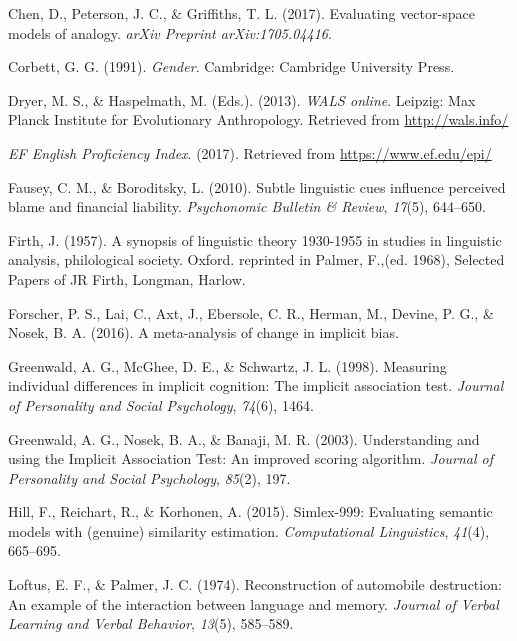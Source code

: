 \documentclass[10pt, letterpaper]{article}
\begin{document}
\hypertarget{ref-chen2017evaluating}{}
Chen, D., Peterson, J. C., \& Griffiths, T. L. (2017). Evaluating
vector-space models of analogy. \emph{arXiv Preprint arXiv:1705.04416}.

\hypertarget{ref-corbett1991}{}
Corbett, G. G. (1991). \emph{Gender}. Cambridge: Cambridge University
Press.

\hypertarget{ref-wals}{}
Dryer, M. S., \& Haspelmath, M. (Eds.). (2013). \emph{WALS online}.
Leipzig: Max Planck Institute for Evolutionary Anthropology. Retrieved
from \url{http://wals.info/}

\hypertarget{ref-epi}{}
\emph{EF English Proficiency Index}. (2017). Retrieved from
\url{https://www.ef.edu/epi/}

\hypertarget{ref-fausey2010subtle}{}
Fausey, C. M., \& Boroditsky, L. (2010). Subtle linguistic cues
influence perceived blame and financial liability. \emph{Psychonomic
Bulletin \& Review}, \emph{17}(5), 644--650.

\hypertarget{ref-firth1957synopsis}{}
Firth, J. (1957). A synopsis of linguistic theory 1930-1955 in studies
in linguistic analysis, philological society. Oxford. reprinted in
Palmer, F.,(ed. 1968), Selected Papers of JR Firth, Longman, Harlow.

\hypertarget{ref-forscher2016meta}{}
Forscher, P. S., Lai, C., Axt, J., Ebersole, C. R., Herman, M., Devine,
P. G., \& Nosek, B. A. (2016). A meta-analysis of change in implicit
bias.

\hypertarget{ref-greenwald1998measuring}{}
Greenwald, A. G., McGhee, D. E., \& Schwartz, J. L. (1998). Measuring
individual differences in implicit cognition: The implicit association
test. \emph{Journal of Personality and Social Psychology}, \emph{74}(6),
1464.

\hypertarget{ref-greenwald2003understanding}{}
Greenwald, A. G., Nosek, B. A., \& Banaji, M. R. (2003). Understanding
and using the Implicit Association Test: An improved scoring algorithm.
\emph{Journal of Personality and Social Psychology}, \emph{85}(2), 197.

\hypertarget{ref-hill2015simlex}{}
Hill, F., Reichart, R., \& Korhonen, A. (2015). Simlex-999: Evaluating
semantic models with (genuine) similarity estimation.
\emph{Computational Linguistics}, \emph{41}(4), 665--695.

\hypertarget{ref-loftus1974reconstruction}{}
Loftus, E. F., \& Palmer, J. C. (1974). Reconstruction of automobile
destruction: An example of the interaction between language and memory.
\emph{Journal of Verbal Learning and Verbal Behavior}, \emph{13}(5),
585--589.
\end{document}
